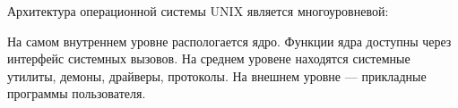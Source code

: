 Архитектура операционной системы UNIX является многоуровневой:

На самом внутреннем уровне распологается ядро. Функции ядра доступны через интерфейс системных вызовов. На среднем уровене находятся системные утилиты, демоны, драйверы, протоколы. На внешнем уровне --- прикладные программы пользователя.
